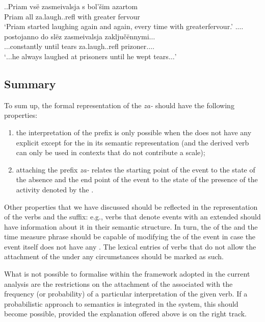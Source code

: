 \ex.\label{ex:za:laugh}\ag.\label{ex:za:laugh1}Priam vs\"{e} zasmeivalsja s bol'\v{s}im azartom\\
Priam all za.laugh..refl with greater fervour\\
\trans `Priam started laughing again and again, every time with greater\linebreak fervour.'
\bg.\label{ex:za:laugh2}$\ldots$postojanno do sl\"{e}z zasmeivalsja zaklju\v{c}\"{e}nnymi$\ldots$\\
$\ldots$constantly until tears za.laugh..refl prizoner.$\ldots$\\
\trans `$\ldots$he always laughed at prisoners until he wept tears$\ldots$'


\subsection{Summary}
To sum up, the formal representation of the  \textit{za-} should have the following properties: 
\begin{enumerate}
\item the  interpretation of the prefix is only possible when the  does not have any explicit  except for the  in its semantic representation (and the derived verb can only be used in contexts that do not contribute a scale);
\item attaching the prefix \textit{za-} relates the starting point of the event to the state of the absence and the end point of the event to the state of the presence of the activity denoted by the .
\end{enumerate}

Other properties that we have discussed should be reflected in the representation of the verbs and the  suffix: e.g., verbs that denote events with an extended  should have information about it in their semantic structure. In turn, the  of the  and the time measure phrase should be capable of modifying the  of the event in case the event itself does not have any . The lexical entries of verbs that do not allow the attachment of the  under any circumstances should be marked as such.

What is not possible to formalise within the framework adopted in the current analysis are the restrictions on the attachment of the  associated with the frequency (or probability) of a particular interpretation of the given verb. If a probabilistic approach to semantics is integrated in the system, this should become possible, provided the explanation offered above is on the right track.

